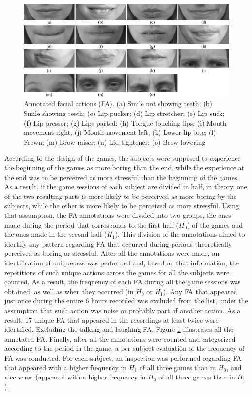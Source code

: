 \begin{figure}[!h]
\centering
\includegraphics[width=\textwidth]{Content/figures/facial-actions}
\caption{Annotated facial actions (FA). (a) Smile not showing teeth; (b) Smile showing teeth; (c) Lip pucker; (d) Lip stretcher; (e) Lip suck; (f) Lip pressor; (g) Lips parted; (h) Tongue touching lips; (i) Mouth movement right; (j) Mouth movement left; (k) Lower lip bite; (l) Frown; (m) Brow raiser; (n) Lid tightener; (o) Brow lowering}
\label{fig:fa}
\end{figure}

According to the design of the games, the subjects were supposed to experience the beginning of the games as more boring than the end, while the experience at the end was to be perceived as more stressful than the beginning of the games. As a result, if the game sessions of each subject are divided in half, in theory, one of the two resulting parts is more likely to be perceived as more boring by the subjects, while the other is more likely to be perceived as more stressful. Using that assumption, the FA annotations were divided into two groups, the ones made during the period that corresponds to the first half ($H_0$) of the games and the ones made in the second half ($H_1$). This division of the annotations aimed to identify any pattern regarding FA that occurred during periods theoretically perceived as boring or stressful. After all the annotations were made, an identification of uniqueness was performed and, based on that information, the repetitions of such unique actions across the games for all the subjects were counted. As a result, the frequency of each FA during all the game sessions was obtained, as well as when they occurred (in $H_0$ or $H_1$). Any FA that appeared just once during the entire 6 hours recorded was excluded from the list, under the assumption that such action was noise or probably part of another action. As a result, 17 unique FA that appeared in the recordings at least twice were identified. Excluding the talking and laughing FA, Figure \ref{fig:fa} illustrates all the annotated FA. Finally, after all the annotations were counted and categorized according to the period in the game, a per-subject evaluation of the frequency of FA was conducted. For each subject, an inspection was performed regarding FA that appeared with a higher frequency in $H_1$ of all three games than in $H_0$, and vice versa (appeared with a higher frequency in $H_0$ of all three games than in $H_1$).

